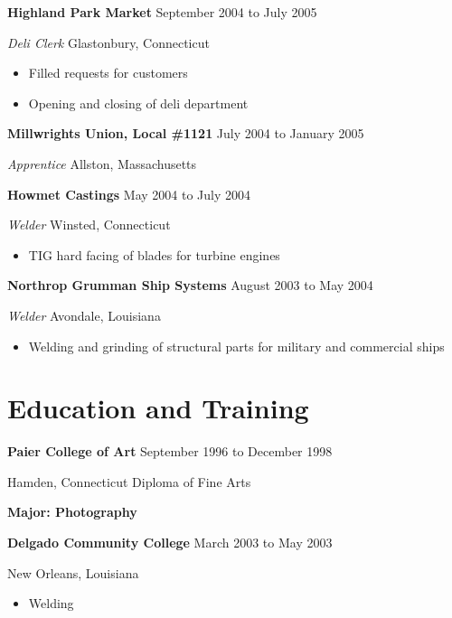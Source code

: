 \documentclass[9pt]{extarticle}
\begin{document}
\textbf{Highland Park Market} \hfill September 2004 to July 2005

\textit{Deli Clerk} \hfill Glastonbury, Connecticut

\begin{multicols}{2}
\begin{itemize}
    \item Filled requests for customers 
    \item Opening and closing of deli department
\end{itemize}
\end{multicols}

\textbf{Millwrights Union, Local \#1121} \hfill July 2004 to January 2005 

\textit{Apprentice} \hfill Allston, Massachusetts

\hfill

\textbf{Howmet Castings} \hfill May 2004 to July 2004 

\textit{Welder} \hfill Winsted, Connecticut

\begin{itemize}
    \item TIG hard facing of blades for turbine engines
\end{itemize}

\textbf{Northrop Grumman Ship Systems} \hfill August 2003 to May 2004 

\textit{Welder} \hfill Avondale, Louisiana

\begin{itemize}
    \item Welding and grinding of structural parts for military and commercial ships
\end{itemize}

\section*{Education and Training}
\textbf{Paier College of Art}  \hfill September 1996 to December 1998

Hamden, Connecticut \hfill Diploma of Fine Arts 

\hfill \textbf{Major: Photography}

\hfill

\textbf{Delgado Community College} \hfill March 2003 to May 2003

New Orleans, Louisiana

\begin{itemize}
    \item Welding
\end{itemize}
\end{document}
